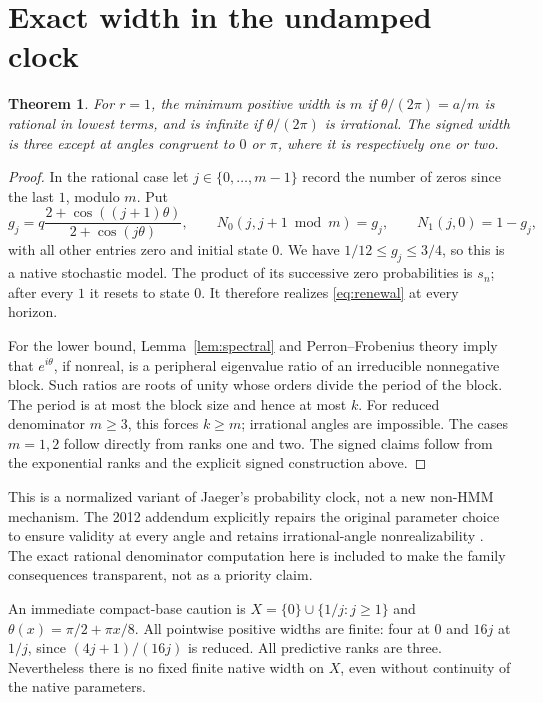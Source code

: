 \documentclass[11pt]{article}
\newtheorem{theorem}{Theorem}
\begin{document}
\section{Exact width in the undamped clock}
\begin{theorem}\label{thm:clock}
For $r=1$, the minimum positive width is $m$ if $\theta/(2\pi)=a/m$ is rational in lowest terms, and is infinite if $\theta/(2\pi)$ is irrational. The signed width is three except at angles congruent to $0$ or $\pi$, where it is respectively one or two.
\end{theorem}
\begin{proof}
In the rational case let $j\in\{0,\ldots,m-1\}$ record the number of zeros since the last $1$, modulo $m$. Put
\[
 g_j=q\frac{2+\cos((j+1)\theta)}{2+\cos(j\theta)},\qquad
 N_0(j,j+1\bmod m)=g_j,\qquad N_1(j,0)=1-g_j,
\]
with all other entries zero and initial state $0$. We have $1/12\leq g_j\leq3/4$, so this is a native stochastic model. The product of its successive zero probabilities is $s_n$; after every $1$ it resets to state $0$. It therefore realizes \eqref{eq:renewal} at every horizon.

For the lower bound, Lemma~\ref{lem:spectral} and Perron--Frobenius theory imply that $e^{i\theta}$, if nonreal, is a peripheral eigenvalue ratio of an irreducible nonnegative block. Such ratios are roots of unity whose orders divide the period of the block. The period is at most the block size and hence at most $k$. For reduced denominator $m\geq3$, this forces $k\geq m$; irrational angles are impossible. The cases $m=1,2$ follow directly from ranks one and two. The signed claims follow from the exponential ranks and the explicit signed construction above.
\end{proof}

This is a normalized variant of Jaeger's probability clock, not a new non-HMM mechanism. The 2012 addendum explicitly repairs the original parameter choice to ensure validity at every angle and retains irrational-angle nonrealizability \cite{Jaeger,Addendum}. The exact rational denominator computation here is included to make the family consequences transparent, not as a priority claim.

An immediate compact-base caution is $X=\{0\}\cup\{1/j:j\geq1\}$ and $\theta(x)=\pi/2+\pi x/8$. All pointwise positive widths are finite: four at $0$ and $16j$ at $1/j$, since $(4j+1)/(16j)$ is reduced. All predictive ranks are three. Nevertheless there is no fixed finite native width on $X$, even without continuity of the native parameters.
\end{document}
